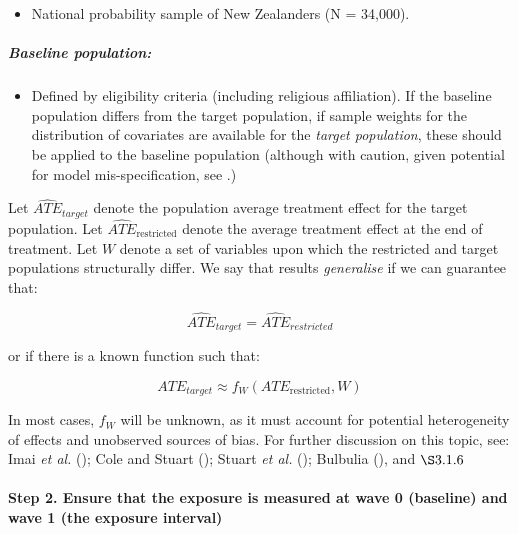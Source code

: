 \documentclass[
  singlecolumn]{article}
\let\oldparagraph\paragraph
\renewcommand{\paragraph}[1]{\oldparagraph{#1}\mbox{}}
\let\oldsubparagraph\subparagraph
\renewcommand{\subparagraph}[1]{\oldsubparagraph{#1}\mbox{}}
\providecommand{\tightlist}{%
  \setlength{\itemsep}{0pt}\setlength{\parskip}{0pt}}\usepackage{longtable,booktabs,array}
\begin{document}
\begin{itemize}
\tightlist
\item
  National probability sample of New Zealanders (N = 34,000).
\end{itemize}

\subparagraph{Baseline population:}\label{baseline-population}

\begin{itemize}
\tightlist
\item
  Defined by eligibility criteria (including religious affiliation). If
  the baseline population differs from the target population, if sample
  weights for the distribution of covariates are available for the
  \emph{target population}, these should be applied to the baseline
  population (although with caution, given potential for model
  mis-specification, see .)
\end{itemize}

Let \(\widehat{ATE}_{target}\) denote the population average treatment
effect for the target population. Let
\(\widehat{ATE}_{\text{restricted}}\) denote the average treatment
effect at the end of treatment. Let \(W\) denote a set of variables upon
which the restricted and target populations structurally differ. We say
that results \emph{generalise} if we can guarantee that:

\[
\widehat{ATE}_{target} =  \widehat{ATE}_{restricted} 
\]

or if there is a known function such that:

\[
ATE_{target}\approx  f_W(ATE_{\text{restricted}}, W)
\]

In most cases, \(f_W\) will be unknown, as it must account for potential
heterogeneity of effects and unobserved sources of bias. For further
discussion on this topic, see: Imai \emph{et al.}
(); Cole and Stuart
(); Stuart \emph{et al.}
(); Bulbulia
(), and \(\S 3.1.6\)

\paragraph{Step 2. Ensure that the exposure is measured at wave 0
(baseline) and wave 1 (the exposure
interval)}\label{step-2.-ensure-that-the-exposure-is-measured-at-wave-0-baseline-and-wave-1-the-exposure-interval}
\end{document}
